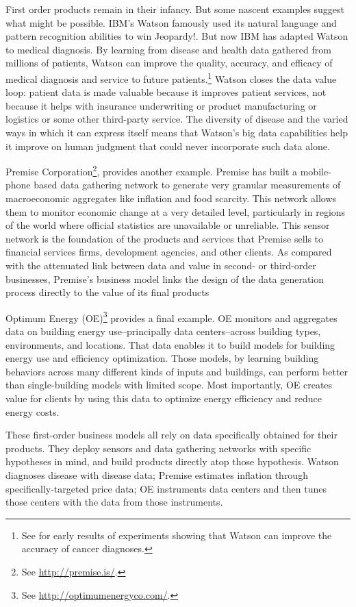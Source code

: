 \documentclass[12pt]{article}
\begin{document}
First order products remain in their infancy. But some nascent
examples suggest what might be possible. IBM's Watson famously used
its natural language and pattern recognition abilities to win
Jeopardy!. But now IBM has adapted Watson to medical diagnosis. By
learning from disease and health data gathered from millions of
patients, Watson can improve the quality, accuracy, and efficacy of
medical diagnosis and service to future patients.\footnote{See
\cite{wired2013a} for early results of experiments showing that Watson
can improve the accuracy of cancer diagnoses.} Watson closes the data
value loop: patient data is made valuable because it improves patient
services, not because it helps with insurance underwriting or product
manufacturing or logistics or some other third-party service. The
diversity of disease and the varied ways in which it can express
itself means that Watson's big data capabilities help it improve on
human judgment that could never incorporate such data alone.

Premise Corporation\footnote{See \url{http://premise.is/}.}, provides another example. Premise has built a mobile-phone
based data gathering network to generate very granular measurements of
macroeconomic aggregates like inflation and food scarcity. This
network allows them to monitor economic change at a very detailed
level, particularly in regions of the world where official statistics
are unavailable or unreliable. This sensor network is the foundation
of the products and services that Premise sells to financial services
firms, development agencies, and other clients. As compared with the
attenuated link between data and value in second- or third-order
businesses, Premise's business model links the design of the data
generation process directly to the value of its final products

Optimum Energy (OE)\footnote{See \url{http://optimumenergyco.com/}.} provides a final example. OE monitors and
aggregates data on building energy use--principally data
centers--across building types, environments, and locations. That data
enables it to build models for building energy use and efficiency
optimization. Those models, by learning building behaviors across many
different kinds of inputs and buildings, can perform better than
single-building models with limited scope. Most importantly, OE
creates value for clients by using this data to optimize energy
efficiency and reduce energy costs.

These first-order business models all rely on data specifically
obtained for their products. They deploy sensors and data gathering
networks with specific hypotheses in mind, and build products directly
atop those hypothesis. Watson diagnoses disease with disease data;
Premise estimates inflation through specifically-targeted price data;
OE instruments data centers and then tunes those centers with the data
from those instruments.
\end{document}
